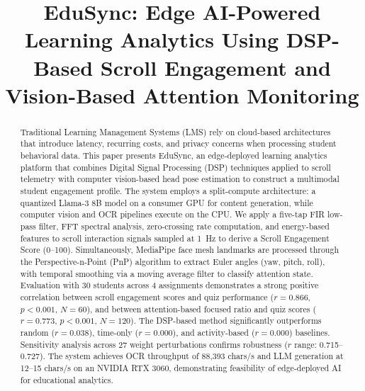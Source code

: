 \documentclass[conference]{IEEEtran}
\begin{document}
\title{EduSync: Edge AI-Powered Learning Analytics Using DSP-Based Scroll Engagement and Vision-Based Attention Monitoring}

\author{
}

\maketitle

\begin{abstract}
Traditional Learning Management Systems (LMS) rely on cloud-based architectures that introduce latency, recurring costs, and privacy concerns when processing student behavioral data. This paper presents EduSync, an edge-deployed learning analytics platform that combines Digital Signal Processing (DSP) techniques applied to scroll telemetry with computer vision-based head pose estimation to construct a multimodal student engagement profile. The system employs a split-compute architecture: a quantized Llama-3 8B model on a consumer GPU for content generation, while computer vision and OCR pipelines execute on the CPU. We apply a five-tap FIR low-pass filter, FFT spectral analysis, zero-crossing rate computation, and energy-based features to scroll interaction signals sampled at 1~Hz to derive a Scroll Engagement Score (0--100). Simultaneously, MediaPipe face mesh landmarks are processed through the Perspective-n-Point (PnP) algorithm to extract Euler angles (yaw, pitch, roll), with temporal smoothing via a moving average filter to classify attention state. Evaluation with 30 students across 4 assignments demonstrates a strong positive correlation between scroll engagement scores and quiz performance ($r = 0.866$, $p < 0.001$, $N = 60$), and between attention-based focused ratio and quiz scores ($r = 0.773$, $p < 0.001$, $N = 120$). The DSP-based method significantly outperforms random ($r = 0.038$), time-only ($r = 0.000$), and activity-based ($r = 0.000$) baselines. Sensitivity analysis across 27 weight perturbations confirms robustness ($r$ range: 0.715--0.727). The system achieves OCR throughput of 88,393 chars/s and LLM generation at 12--15 chars/s on an NVIDIA RTX 3060, demonstrating feasibility of edge-deployed AI for educational analytics.
\end{abstract}
\end{document}
